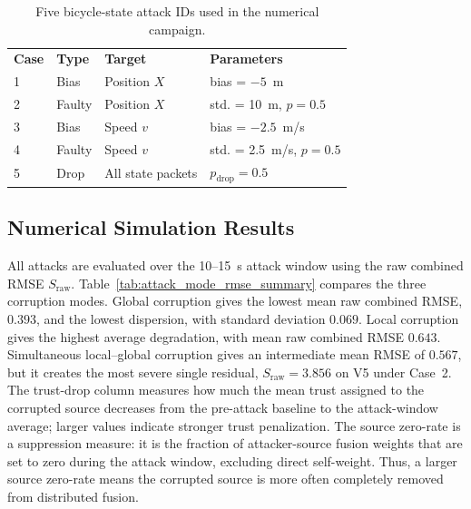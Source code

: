\documentclass[letterpaper,journal]{IEEEtran}
\begin{document}
\begin{table}[!ht]
\centering
\caption{Five bicycle-state attack IDs used in the numerical campaign.}
\label{tab:attack_mix}
\scriptsize
\begin{tabular}{p{0.7cm}p{1.35cm}p{2.0cm}p{3.0cm}}
\toprule
\textbf{Case} & \textbf{Type} & \textbf{Target} & \textbf{Parameters} \\
1 & Bias & Position $X$ & bias = $-5$~m \\
2 & Faulty & Position $X$ & std. = 10~m, $p = 0.5$ \\
3 & Bias & Speed $v$ & bias = $-2.5$~m/s \\
4 & Faulty & Speed $v$ & std. = 2.5~m/s, $p = 0.5$ \\
5 & Drop & All state packets & $p_\text{drop} = 0.5$ \\
\bottomrule
\end{tabular}
\end{table}

\subsection{Numerical Simulation Results}

All attacks are evaluated over the 10--15~s attack window using the raw combined RMSE $S_{\mathrm{raw}}$. Table~\ref{tab:attack_mode_rmse_summary} compares the three corruption modes. Global corruption gives the lowest mean raw combined RMSE, $0.393$, and the lowest dispersion, with standard deviation $0.069$. Local corruption gives the highest average degradation, with mean raw combined RMSE $0.643$. Simultaneous local--global corruption gives an intermediate mean RMSE of $0.567$, but it creates the most severe single residual, $S_{\mathrm{raw}}=3.856$ on V5 under Case~2. The trust-drop column measures how much the mean trust assigned to the corrupted source decreases from the pre-attack baseline to the attack-window average; larger values indicate stronger trust penalization. The source zero-rate is a suppression measure: it is the fraction of attacker-source fusion weights that are set to zero during the attack window, excluding direct self-weight. Thus, a larger source zero-rate means the corrupted source is more often completely removed from distributed fusion.
\end{document}
